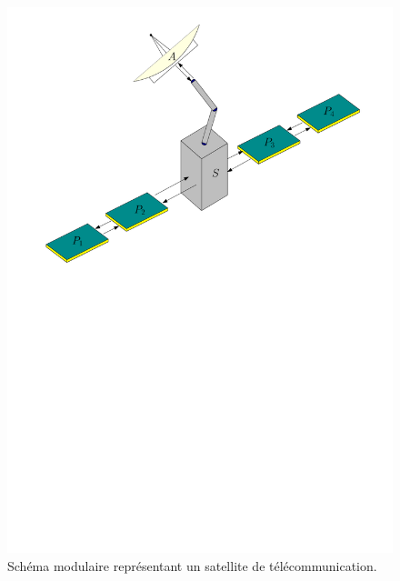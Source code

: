 \documentclass[12pt, french]{article}
\begin{document}
	\begin{figure}[hb]
		\centering
		\includegraphics[width=.6\textwidth]{satellite.pdf}
		\caption{Schéma modulaire représentant un satellite de télécommunication.}
		\label{fig:satellite}
	\end{figure}
\end{document}
